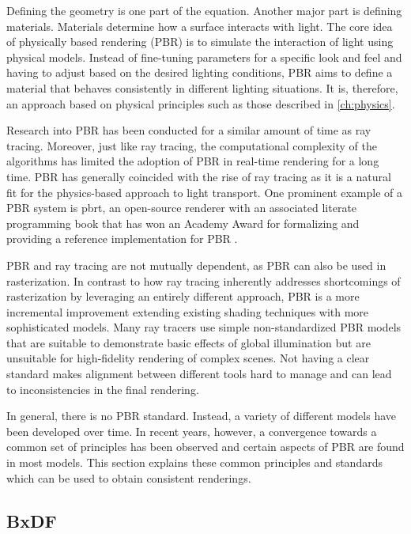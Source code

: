 Defining the geometry is one part of the equation. Another major part is defining materials. Materials determine how a surface interacts with light. The core idea of physically based rendering (\gls{PBR}) is to simulate the interaction of light using physical models. Instead of fine-tuning parameters for a specific look and feel and having to adjust based on the desired lighting conditions, \gls{PBR} aims to define a material that behaves consistently in different lighting situations. It is, therefore, an approach based on physical principles such as those described in \autoref{ch:physics}.

Research into \gls{PBR} has been conducted for a similar amount of time as ray tracing. Moreover, just like ray tracing, the computational complexity of the algorithms has limited the adoption of \gls{PBR} in real-time rendering for a long time. \gls{PBR} has generally coincided with the rise of ray tracing as it is a natural fit for the physics-based approach to light transport. One prominent example of a \gls{PBR} system is \gls{pbrt}, an open-source renderer with an associated literate programming book that has won an Academy Award for formalizing and providing a reference implementation for \gls{PBR} \cite{Pharr_Physically_Based_Rendering_2023}.

\gls{PBR} and ray tracing are not mutually dependent, as \gls{PBR} can also be used in rasterization. In contrast to how ray tracing inherently addresses shortcomings of rasterization by leveraging an entirely different approach, \gls{PBR} is a more incremental improvement extending existing shading techniques with more sophisticated models. Many ray tracers use simple non-standardized \gls{PBR} models that are suitable to demonstrate basic effects of global illumination but are unsuitable for high-fidelity rendering of complex scenes. Not having a clear standard makes alignment between different tools hard to manage and can lead to inconsistencies in the final rendering.

In general, there is no \gls{PBR} standard. Instead, a variety of different models have been developed over time. In recent years, however, a convergence towards a common set of principles has been observed and certain aspects of \gls{PBR} are found in most models. This section explains these common principles and standards which can be used to obtain consistent renderings.

\subsection*{BxDF}
\label{sec:bxdf}

